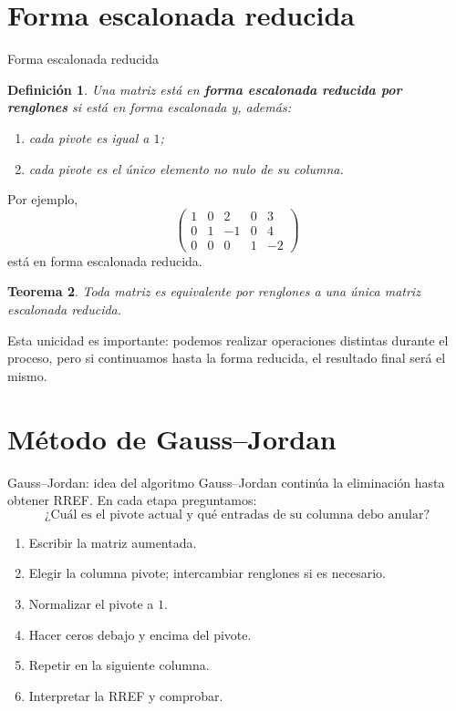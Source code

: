 \documentclass[aspectratio=169,9pt]{beamer}
\newtheorem{definicion}{Definición}[section]
\newtheorem{teorema}[definicion]{Teorema}
\theoremstyle{remark}
\begin{document}
\section{Forma escalonada reducida}
\begin{frame}[allowframebreaks,t]{Forma escalonada reducida}
\begin{definicion}
Una matriz está en \textbf{forma escalonada reducida por renglones} si está en forma escalonada y,
además:
\begin{enumerate}
\item cada pivote es igual a $1$;
\item cada pivote es el único elemento no nulo de su columna.
\end{enumerate}
\end{definicion}

Por ejemplo,
\[
\begin{pmatrix}
1&0&2&0&3\\
0&1&-1&0&4\\
0&0&0&1&-2
\end{pmatrix}
\]
está en forma escalonada reducida.

\begin{teorema}
Toda matriz es equivalente por renglones a una única matriz escalonada reducida.
\end{teorema}

Esta unicidad es importante: podemos realizar operaciones distintas durante el proceso, pero si
continuamos hasta la forma reducida, el resultado final será el mismo.
\end{frame}

\section{Método de Gauss--Jordan}
\begin{frame}[t]{Gauss--Jordan: idea del algoritmo}
Gauss--Jordan continúa la eliminación hasta obtener RREF. En cada etapa preguntamos:
\[
\boxed{\text{¿Cuál es el pivote actual y qué entradas de su columna debo anular?}}
\]
\begin{enumerate}
\item Escribir la matriz aumentada.
\item Elegir la columna pivote; intercambiar renglones si es necesario.
\item Normalizar el pivote a \(1\).
\item Hacer ceros debajo y encima del pivote.
\item Repetir en la siguiente columna.
\item Interpretar la RREF y comprobar.
\end{enumerate}
\end{frame}
\end{document}
